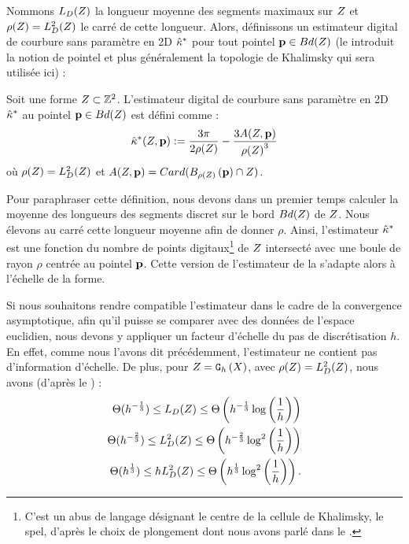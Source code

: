 Nommons $L_D({Z})$ la longueur moyenne des segments maximaux sur
$Z$ et $\rho(Z) = L_D^2({Z})$ le carré de cette
longueur.  Alors, définissons un estimateur digital de courbure sans
paramètre en 2D $\hat{\kappa}^{*}$ pour tout pointel $\mathbf{p} \in Bd({Z})$ (le
 introduit la notion de pointel et plus
généralement la topologie de Khalimsky qui sera utilisée ici) :
%
\begin{definition}
  \label{def:curvature-estimator-2d-pf}
  Soit une forme $Z \subset \mathbb{Z}^2$. L'estimateur digital de courbure
  sans paramètre en 2D $\hat{\kappa}^{*}$ au pointel $\mathbf{p} \in Bd({Z})$ est défini
  comme :
  \begin{equation}
    \hat{\kappa}^{*}( Z, \mathbf{p}) := \frac{3\pi}{2 \rho(Z)} - \frac{3 A(Z,\mathbf{p})}{{\rho(Z)}^3}
  \end{equation}
  où $\rho(Z) =L_D^2(Z)$ et $A(Z,\mathbf{p}) =
  Card(B_{\rho(Z)}\left(\mathbf{p}\right) \cap Z)$.
\end{definition}
%
Pour paraphraser cette définition, nous devons dans un premier temps calculer la
moyenne des longueurs des segments discret sur le bord $Bd({Z})$ de
$Z$. Nous élevons au carré cette longueur moyenne afin de donner $\rho$.
Ainsi, l'estimateur $\hat{\kappa}^{*}$ est une fonction du nombre de points
digitaux\footnote{C'est un abus de langage désignant le centre de la cellule de
Khalimsky, \cad le spel, d'après le choix de plongement dont nous avons
parlé dans le .} de $Z$ intersecté avec une
boule de rayon $\rho$ centrée au pointel $\mathbf{p}$. Cette version de l'estimateur de
la  s'adapte alors à l’échelle de la
forme.


Si nous souhaitons rendre compatible l'estimateur dans le cadre de la
convergence asymptotique, afin qu'il puisse se comparer avec des données de
l'espace euclidien, nous devons y appliquer un facteur d'échelle du pas de
discrétisation $h$. En effet, comme nous l'avons dit précédemment, l'estimateur ne contient pas d'information d'échelle. De plus, pour $Z =
\mathtt{G}_{h}\left(X\right)$, avec $\rho(Z) = L^2_D(Z)$, nous avons (d'après le
) :
%
\begin{align}
  \Theta(h^{-\frac{1}{3}}) \le L_D( Z ) \le \Theta\left(h^{-\frac{1}{3}} \log \left(\frac{1}{h}\right)\right) \\
  \Theta(h^{-\frac{2}{3}}) \le L^2_D( Z ) \le \Theta\left(h^{-\frac{2}{3}} \log^2 \left(\frac{1}{h}\right)\right) \\
  \Theta(h^{\frac{1}{3}}) \le hL^2_D( Z ) \le \Theta\left(h^{\frac{1}{3}} \log^2 \left(\frac{1}{h}\right)\right) \label{eq:bounds-length-MDSS}.
\end{align}
%


